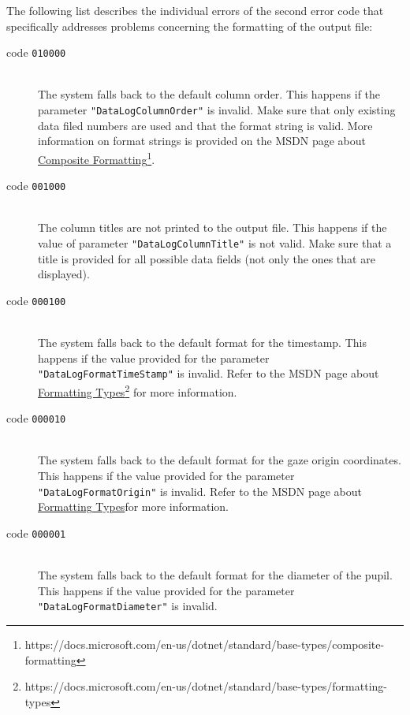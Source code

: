 \documentclass[a4paper,oneside]{book}
\begin{document}
The following list describes the individual errors of the second error code that specifically addresses problems concerning the formatting of the output file:
\begin{description}
    \item[code \texttt{010000}] \hfill \\
        The system falls back to the default column order.
        This happens if the parameter \texttt{"DataLogColumnOrder"} is invalid.
        Make sure that only existing data filed numbers are used and that the format string is valid.
        More information on format strings is provided on the MSDN page about \href{https://docs.microsoft.com/en-us/dotnet/standard/base-types/composite-formatting}{Composite Formatting}\footnote{https://docs.microsoft.com/en-us/dotnet/standard/base-types/composite-formatting}.
    \item[code \texttt{001000}] \hfill \\
        The column titles are not printed to the output file.
        This happens if the value of parameter \texttt{"DataLogColumnTitle"} is not valid.
        Make sure that a title is provided for all possible data fields (not only the ones that are displayed).
    \item[code \texttt{000100}] \hfill \\
        The system falls back to the default format for the timestamp.
        This happens if the value provided for the parameter \texttt{"DataLogFormatTimeStamp"} is invalid.
        Refer to the MSDN page about \href{https://docs.microsoft.com/en-us/dotnet/standard/base-types/formatting-types}{Formatting Types}\footnote{https://docs.microsoft.com/en-us/dotnet/standard/base-types/formatting-types} for more information.
    \item[code \texttt{000010}] \hfill \\
        The system falls back to the default format for the gaze origin coordinates.
        This happens if the value provided for the parameter \texttt{"DataLogFormatOrigin"} is invalid.
        Refer to the MSDN page about \href{https://docs.microsoft.com/en-us/dotnet/standard/base-types/formatting-types}{Formatting Types}\footnotemark[\value{footnote}] for more information.
    \item[code \texttt{000001}] \hfill \\
        The system falls back to the default format for the diameter of the pupil.
        This happens if the value provided for the parameter \texttt{"DataLogFormatDiameter"} is invalid.

\end{description}
\end{document}
